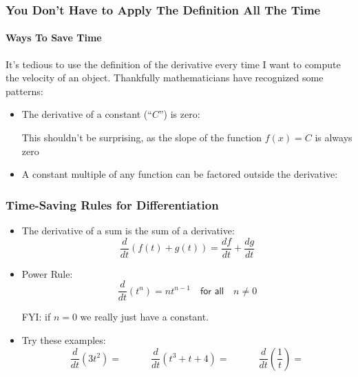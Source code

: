\documentclass[12pt,compress,aspectratio=169]{beamer}
\begin{document}
\begin{frame}
  \frametitle{You Don't Have to Apply The Definition All The Time}
  \framesubtitle{Ways To Save Time}
  It's tedious to use the definition of the derivative every time I want
  to compute the velocity of an object. Thankfully mathematicians have
  recognized some patterns:
  \begin{itemize}
  \item The derivative of a constant (``$C$'') is zero:

    
    \vspace{-0.1in}This shouldn't be surprising, as the slope of the
    function $f(x)=C$ is always zero %

  \item A constant multiple of any function can be factored outside the
    derivative:

  \end{itemize}
\end{frame}

\begin{frame}
  \frametitle{Time-Saving Rules for Differentiation}
  \begin{itemize}
  \item The derivative of a sum is the sum of a derivative:
    {\large
      \begin{displaymath}
        \frac{d}{dt}\left(f(t)+g(t)\right) = \frac{df}{dt}+\frac{dg}{dt}
      \end{displaymath}
    }
  \item Power Rule:
    {\large
      \begin{displaymath}
        \frac{d}{dt}\left(t^n\right) = nt^{n-1}\quad
        \textsf{for all}\quad n\neq 0
      \end{displaymath}
    }

    FYI: if $n=0$ we really just have a constant.
  \item Try these examples:
    \begin{displaymath}
      \frac{d}{dt}\left(3t^2\right)=\quad\quad\quad
      \frac{d}{dt}\left(t^3 + t + 4\right)=\quad\quad\quad
      \frac{d}{dt}\left(\frac{1}{t}\right)=
    \end{displaymath}
  \end{itemize}
\end{frame}
\end{document}
